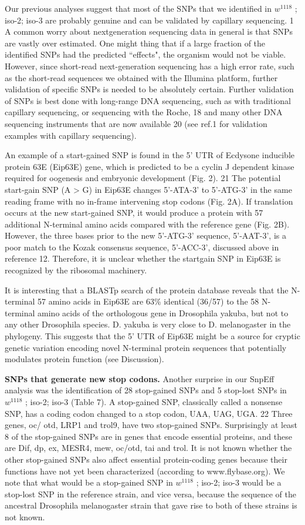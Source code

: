 Our previous analyses suggest that most of the SNPs that we identified in $w^{1118}$ ; iso-2; iso-3 are probably genuine and can be validated by capillary sequencing. 1 A common worry about nextgeneration sequencing data in general is that SNPs are vastly over estimated. One might thing that if a large fraction of the identified SNPs had the predicted ``effects", the organism would not be viable. However, since short-read next-generation sequencing has a high error rate, such as the short-read sequences we obtained with the Illumina platform, further validation of specific SNPs is needed to be absolutely certain. Further validation of SNPs is best done with long-range DNA sequencing, such as with traditional capillary sequencing, or sequencing with the Roche, 18 and many other DNA sequencing instruments that are now available 20 (see ref.1 for validation examples with capillary sequencing).

An example of a start-gained SNP is found in the 5' UTR of Ecdysone inducible protein 63E (Eip63E) gene, which is predicted to be a cyclin J dependent kinase required for oogenesis and embryonic development (Fig. 2). 21 The potential start-gain SNP (A > G) in Eip63E changes 5'-ATA-3' to 5'-ATG-3' in the same reading frame with no in-frame intervening stop codons (Fig.  2A). If translation occurs at the new start-gained SNP, it would produce a protein with 57 additional N-terminal amino acids compared with the reference gene (Fig. 2B). However, the three bases prior to the new 5'-ATG-3' sequence, 5'-AAT-3', is a poor match to the Kozak consensus sequence, 5'-ACC-3', discussed above in reference 12. Therefore, it is unclear whether the startgain SNP in Eip63E is recognized by the ribosomal machinery.

It is interesting that a BLASTp search of the protein database reveals that the N-terminal 57 amino acids in Eip63E are 63\% identical (36/57) to the 58 N-terminal amino acids of the orthologous gene in Drosophila yakuba, but not to any other Drosophila species. D. yakuba is very close to D. melanogaster in the phylogeny. This suggests that the 5' UTR of Eip63E might be a source for cryptic genetic variation encoding novel N-terminal protein sequences that potentially modulates protein function (see Discussion).

\textbf{SNPs that generate new stop codons.} Another surprise in our SnpEff analysis was the identification of 28 stop-gained SNPs and 5 stop-lost SNPs in $w^{1118}$ ; iso-2; iso-3 (Table 7). A stop-gained SNP, classically called a nonsense SNP, has a coding codon changed to a stop codon, UAA, UAG, UGA. 22 Three genes, oc/ otd, LRP1 and trol9, have two stop-gained SNPs. Surprisingly at least 8 of the stop-gained SNPs are in genes that encode essential proteins, and these are Dif, dp, ex, MESR4, mew, oc/otd, tai and trol. It is not known whether the other stop-gained SNPs also affect essential protein-coding genes because their functions have not yet been characterized (according to www.flybase.org). We note that what would be a stop-gained SNP in $w^{1118}$ ; iso-2; iso-3 would be a stop-lost SNP in the reference strain, and vice versa, because the sequence of the ancestral Drosophila melanogaster strain that gave rise to both of these strains is not known.

